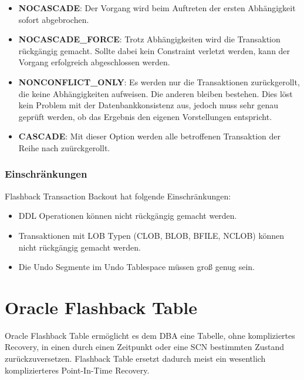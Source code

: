           \begin{itemize}
            \item \textbf{NOCASCADE}: Der Vorgang wird beim Auftreten der ersten Abhängigkeit sofort abgebrochen.
            \item \textbf{NOCASCADE\_FORCE}: Trotz Abhängigkeiten wird die Transaktion rückgängig gemacht. Sollte dabei kein Constraint verletzt werden, kann der Vorgang erfolgreich abgeschlossen werden.
            \item \textbf{NONCONFLICT\_ONLY}: Es werden nur die Transaktionen zurückgerollt, die keine Abhängigkeiten aufweisen. Die anderen bleiben bestehen. Dies löst kein Problem mit der Datenbankkonsistenz aus, jedoch muss sehr genau geprüft werden, ob das Ergebnis den eigenen Vorstellungen entspricht.
            \item \textbf{CASCADE}: Mit dieser Option werden alle betroffenen Transaktion der Reihe nach zuürckgerollt.
          \end{itemize}
        \subsubsection{Einschränkungen}
          Flashback Transaction Backout hat folgende Einschränkungen:
          \begin{itemize}
            \item DDL Operationen können nicht rückgängig gemacht werden.
            \item Transaktionen mit LOB Typen (CLOB, BLOB, BFILE, NCLOB) können nicht rückgängig gemacht werden.
            \item Die Undo Segmente im Undo Tablespace müssen groß genug sein.
          \end{itemize}

          \begin{literaturinternet}
            \item \cite{dflashbhtm}
            \item \cite{ADFNS01009}
          \end{literaturinternet}
    \section{Oracle Flashback Table}
      Oracle Flashback Table ermöglicht es dem DBA eine Tabelle, ohne kompliziertes Recovery, in einen durch einen Zeitpunkt oder eine SCN bestimmten Zustand zurückzuversetzen. Flashback Table ersetzt dadurch meist ein wesentlich komplizierteres Point-In-Time Recovery.

